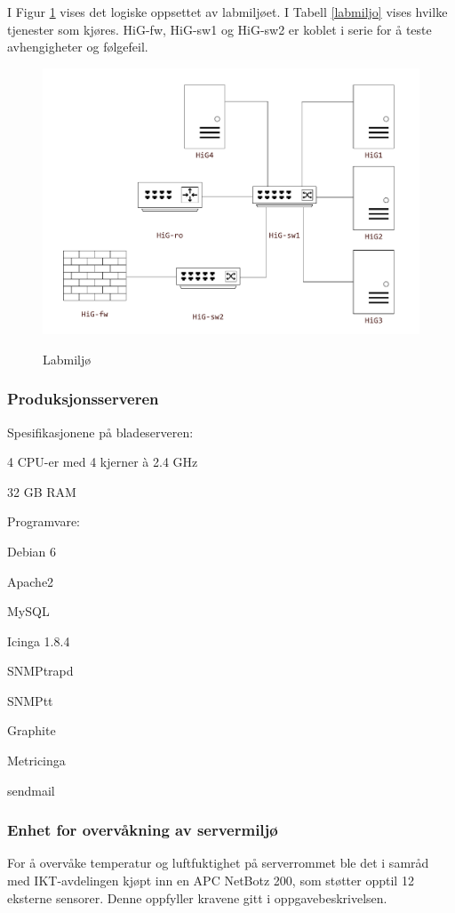I Figur \ref{laboppsett} vises det logiske oppsettet av labmiljøet. I Tabell \ref{labmiljo} vises hvilke tjenester som kjøres. HiG-fw, HiG-sw1 og HiG-sw2 er koblet i serie for å teste avhengigheter og følgefeil.

\begin{figure}[H]
    \centering
    \includegraphics[scale=0.4]{img/labmiljo}
	\label{laboppsett}
    \caption{Labmiljø}
\end{figure}

\subsubsection{Produksjonsserveren}
Spesifikasjonene på bladeserveren:
\begin{itemize*}
\item 4 CPU-er med 4 kjerner à 2.4 GHz
\item 32 GB RAM
\end{itemize*}
Programvare:
\begin{itemize*}
\item Debian 6
\item Apache2
\item MySQL
\item Icinga 1.8.4
\item SNMPtrapd
\item SNMPtt
\item Graphite
\item Metricinga 
\item sendmail
\end{itemize*}

\subsubsection{Enhet for overvåkning av servermiljø}
For å overvåke temperatur og luftfuktighet på serverrommet ble det i samråd med IKT-avdelingen kjøpt inn en APC NetBotz 200, som støtter opptil 12 eksterne sensorer\cite{netbotz}. Denne oppfyller kravene gitt i oppgavebeskrivelsen. 

